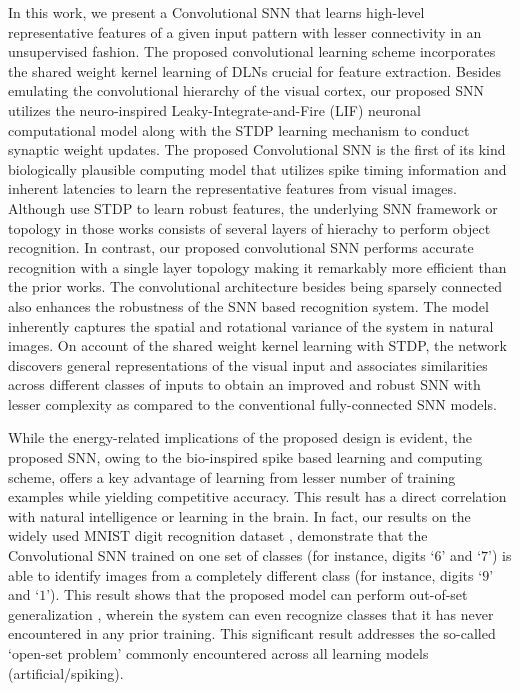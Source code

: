 \documentclass[journal, onecolumn]{IEEEtran}
\begin{document}
In this work, we present a Convolutional SNN that learns high-level representative features of a given input pattern with lesser connectivity in an unsupervised fashion. The proposed convolutional learning scheme incorporates the shared weight kernel learning of DLNs  crucial for feature extraction. Besides emulating the convolutional hierarchy of the visual cortex, our proposed SNN utilizes the neuro-inspired Leaky-Integrate-and-Fire (LIF) neuronal computational model along with the STDP learning mechanism to conduct synaptic weight updates. The proposed Convolutional SNN is the first of its kind biologically plausible computing model that utilizes spike timing information and inherent latencies to learn the representative features from visual images. Although \cite{masquelier2007unsupervised, kheradpisheh2016stdp, kheradpisheh2016bio} use STDP to learn robust features, the underlying SNN framework or topology in those works consists of several layers of hierachy to perform object recognition. In contrast, our proposed convolutional SNN performs accurate recognition with a single layer topology making it remarkably more efficient than the prior works. The convolutional architecture besides being sparsely connected also enhances the robustness of the SNN based recognition system. The model inherently captures the spatial and rotational variance of the system in natural images. On account of the shared weight kernel learning with STDP, the network discovers general representations of the visual input and associates similarities across different classes of inputs to obtain an improved and robust SNN with lesser complexity as compared to the conventional fully-connected SNN models. 

While the energy-related implications of the proposed design is evident, the proposed SNN, owing to the bio-inspired spike based learning and computing scheme, offers a key advantage of learning from lesser number of training examples while yielding competitive accuracy. This result has a direct correlation with natural intelligence or learning in the brain. In fact, our results on the widely used MNIST digit recognition dataset \cite{lecun1998mnist}, demonstrate that the Convolutional SNN trained on one set of classes (for instance, digits `$6$' and `$7$') is able to identify images from a  completely different class (for instance, digits `$9$' and `$1$'). This result shows that the proposed model can perform out-of-set generalization \cite{cox2014neural}, wherein the system can even recognize classes that it has never encountered in any prior training. This significant result addresses the so-called ‘open-set problem’ \cite{scheirer2014probability, dean2013fast} commonly encountered across all learning models (artificial/spiking).
\end{document}
